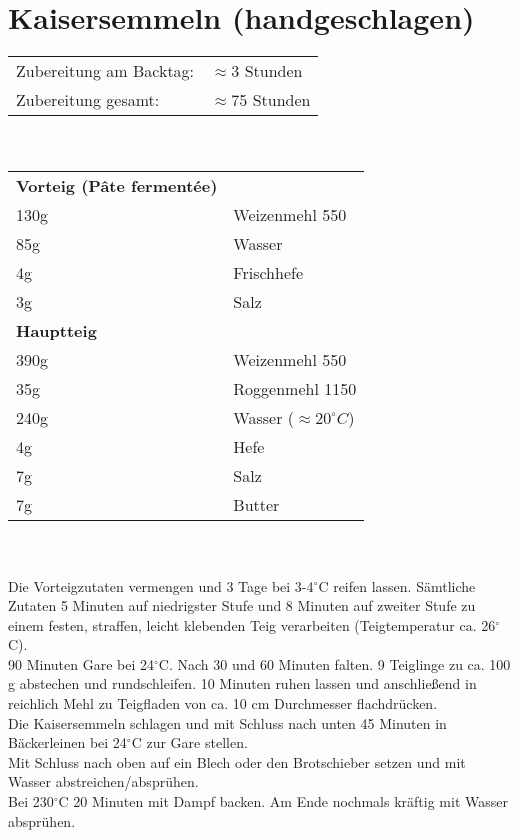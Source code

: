 \section{Kaisersemmeln (handgeschlagen)}
\begin{tabular}{ll}
    Zubereitung am Backtag: & $\approx$3 Stunden  \\
    Zubereitung gesamt:     & $\approx$75 Stunden \\
\end{tabular}\\

\paragraph{}
\begin{tabular}{ll}
    \textbf{Vorteig (Pâte fermentée)} \\
    130g & Weizenmehl 550                \\
    85g  & Wasser                        \\
    4g   & Frischhefe                    \\
    3g   & Salz                          \\
    \textbf{Hauptteig} \\
    390g & Weizenmehl 550                \\
    35g  & Roggenmehl 1150               \\
    240g & Wasser ($\approx 20^\circ C$) \\
    4g   & Hefe                          \\
    7g   & Salz                          \\
    7g   & Butter                        \\
\end{tabular}\\

\paragraph{}
Die Vorteigzutaten vermengen und 3 Tage bei 3-4$^\circ$C reifen lassen.
Sämtliche Zutaten 5 Minuten auf niedrigster Stufe und 8 Minuten auf zweiter Stufe zu einem festen, straffen, leicht klebenden Teig verarbeiten (Teigtemperatur ca. 26$^\circ$C). \\
90 Minuten Gare bei 24$^\circ$C. Nach 30 und 60 Minuten falten.
9 Teiglinge zu ca. 100 g abstechen und rundschleifen. 10 Minuten ruhen lassen und anschließend in reichlich Mehl zu Teigfladen von ca. 10 cm Durchmesser flachdrücken. \\
Die Kaisersemmeln schlagen und mit Schluss nach unten 45 Minuten in Bäckerleinen bei 24$^\circ$C zur Gare stellen. \\
Mit Schluss nach oben auf ein Blech oder den Brotschieber setzen und mit Wasser abstreichen/absprühen. \\
Bei 230$^\circ$C 20 Minuten mit Dampf backen. Am Ende nochmals kräftig mit Wasser absprühen. \\\newpage


